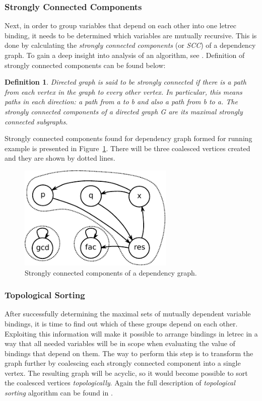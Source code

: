 \documentclass[12pt,a4paper]{report}
\newtheorem{definition}{Definition}[chapter]
\begin{document}
\subsubsection{Strongly Connected Components}
Next, in order to group variables that depend on each other into one letrec
binding, it needs to be determined which variables are mutually recursive. This is
done by calculating the \textit{strongly connected components} (or
\textit{SCC}) of a dependency graph. To gain a deep insight into analysis of an
algorithm, see \cite{Cormen03}. Definition of strongly connected components can
be found below:

\begin{definition}
Directed graph is said to be strongly connected if there is a path from each
vertex in the graph to every other vertex. In particular, this means paths in
each direction: a path from a to b and also a path from b to a.
The strongly connected components of a directed graph G are its maximal
strongly connected subgraphs.
\end{definition}

Strongly connected components found for dependency graph formed for running
example is presented in Figure~\ref{fig:topsorted_scc}. There will be three
coalesced vertices created and they are shown by dotted lines.

\vspace*{0.2in}
\begin{figure}[h!]
  \centering
  \includegraphics[height=5cm]{scc_graph}
  \caption{Strongly connected components of a dependency graph.}
  \label{fig:topsorted_scc}
\end{figure}

\subsubsection{Topological Sorting}
After successfully determining the maximal sets of mutually dependent variable
bindings, it is time to find out which of these groups depend on each other.
Exploiting this information will make it possible to arrange bindings in letrec
in a way that all needed variables will be in scope when evaluating the value
of bindings that depend on them. The way to perform this step is to transform
the graph further by coalescing each strongly connected component into a single
vertex.  The resulting graph will be acyclic, so it would become possible to
sort the coalesced vertices \textit{topologically}. Again the full description
of \textit{topological sorting} algorithm can be found in \cite{Cormen03}.
\end{document}
